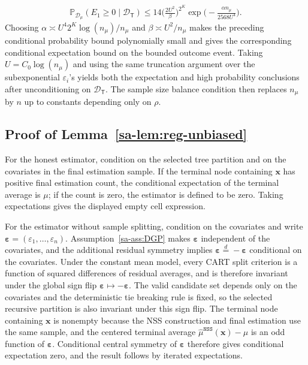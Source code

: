 \documentclass[10pt]{article}
\def\treeT{\mathsf{T}}
\def\bx{\mathbf{x}}
\def\bvarepsilon{\boldsymbol{\varepsilon}}
\def\P{\mathbb{P}}
\def\dataD{\mathcal{D}}
\theoremstyle{definition}
\theoremstyle{remark}
\begin{document}
\begin{align*}
    \P_{\dataD_{\mu}}(E_1 \geq 0 \;|\;\dataD_{\treeT}) \leq 14 \bigg(\frac{2 U^2}{\beta}\bigg)^{2^{K}} \exp \bigg(- \frac{\alpha n_{\mu}}{2568 U^4} \bigg).
\end{align*}
Choosing $\alpha \asymp U^4 2^K \log(n_{\mu})/n_{\mu}$ and $\beta \asymp U^2/n_{\mu}$ makes the preceding conditional probability bound polynomially small and gives the corresponding conditional expectation bound on the bounded outcome event. Taking $U=C_0\log(n_{\mu})$ and using the same truncation argument over the subexponential $\varepsilon_i$'s yields both the expectation and high probability conclusions after unconditioning on $\dataD_{\treeT}$. The sample size balance condition then replaces $n_{\mu}$ by $n$ up to constants depending only on $\rho$.

\subsection{Proof of Lemma~\ref{sa-lem:reg-unbiased}}

For the honest estimator, condition on the selected tree partition and on the covariates in the final estimation sample. If the terminal node containing $\bx$ has positive final estimation count, the conditional expectation of the terminal average is $\mu$; if the count is zero, the estimator is defined to be zero. Taking expectations gives the displayed empty cell expression.

For the estimator without sample splitting, condition on the covariates and write $\bvarepsilon=(\varepsilon_1,\ldots,\varepsilon_n)$. Assumption~\ref{sa-ass:DGP} makes $\bvarepsilon$ independent of the covariates, and the additional residual symmetry implies $\bvarepsilon\stackrel{d}{=}-\bvarepsilon$ conditional on the covariates. Under the constant mean model, every CART split criterion is a function of squared differences of residual averages, and is therefore invariant under the global sign flip $\bvarepsilon\mapsto-\bvarepsilon$. The valid candidate set depends only on the covariates and the deterministic tie breaking rule is fixed, so the selected recursive partition is also invariant under this sign flip. The terminal node containing $\bx$ is nonempty because the NSS construction and final estimation use the same sample, and the centered terminal average $\hat\mu^{\mathtt{NSS}}(\bx)-\mu$ is an odd function of $\bvarepsilon$. Conditional central symmetry of $\bvarepsilon$ therefore gives conditional expectation zero, and the result follows by iterated expectations.
\end{document}
